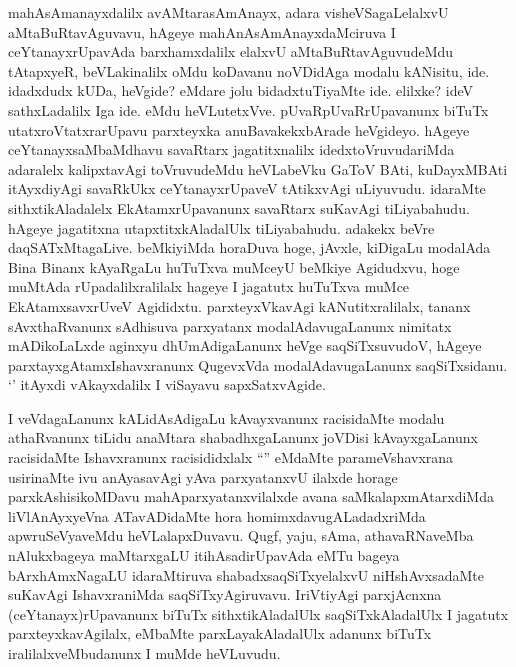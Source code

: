 \begin{artha}
mahAsAmanayxdalilx avAMtarasAmAnayx, adara visheVSagaLelalxvU
aMtaBuRtavAguvavu, hAgeye mahAnAsAmAnayxdaMciruva I ceYtanayxrUpavAda
barxhamxdalilx elalxvU aMtaBuRtavAguvudeMdu tAtapxyeR, beVLakinalilx
oMdu koDavanu noVDidAga modalu kANisitu, ide. idadxdudx kUDa, heVgide?
eMdare jolu bidadxtuTiyaMte ide. elilxke? ideV sathxLadalilx Iga
ide. eMdu heVLutetxVve. pUvaRpUvaRrUpavanunx biTuTx
utatxroVtatxrarUpavu parxteyxka anuBavakekxbArade heVgideyo. hAgeye
ceYtanayxsaMbaMdhavu savaRtarx jagatitxnalilx idedxtoVruvudariMda
adaralelx kalipxtavAgi toVruvudeMdu heVLabeVku GaToV BAti, kuDayxMBAti
itAyxdiyAgi savaRkUkx ceYtanayxrUpaveV tAtikxvAgi uLiyuvudu. idaraMte
sithxtikAladalelx EkAtamxrUpavanunx savaRtarx suKavAgi
tiLiyabahudu. hAgeye jagatitxna utapxtitxkAladalUlx
tiLiyabahudu. adakekx beVre daqSATxMtagaLive. beMkiyiMda horaDuva
hoge, jAvxle, kiDigaLu modalAda Bina Binanx kAyaRgaLu huTuTxva muMceyU
beMkiye Agidudxvu, hoge muMtAda rUpadalilxralilalx hageye I jagatutx
huTuTxva muMce EkAtamxsavxrUveV Agididxtu. parxteyxVkavAgi
kANutitxralilalx, tananx sAvxthaRvanunx sAdhisuva parxyatanx
modalAdavugaLanunx nimitatx mADikoLaLxde aginxyu dhUmAdigaLanunx heVge
saqSiTxsuvudoV, hAgeye parxtayxgAtamxIshavxranunx QugevxVda
modalAdavugaLanunx saqSiTxsidanu. `\stext' itAyxdi vAkayxdalilx I
viSayavu sapxSatxvAgide.
\end{artha}

\begin{center}


\end{center}

\begin{artha}
I veVdagaLanunx kALidAsAdigaLu kAvayxvanunx racisidaMte modalu
athaRvanunx tiLidu anaMtara shabadhxgaLanunx joVDisi kAvayxgaLanunx
racisidaMte Ishavxranunx racisididxlalx ``\stext'' eMdaMte
parameVshavxrana usirinaMte ivu anAyasavAgi yAva parxyatanxvU ilalxde
horage parxkAshisikoMDavu mahAparxyatanxvilalxde avana
saMkalapxmAtarxdiMda liVlAnAyxyeVna ATavADidaMte hora
homimxdavugALadadxriMda apwruSeVyaveMdu heVLalapxDuvavu. Qugf, yaju,
sAma, athavaRNaveMba nAlukxbageya maMtarxgaLU itihAsadirUpavAda eMTu
bageya bArxhAmxNagaLU idaraMtiruva shabadxsaqSiTxyelalxvU
niHshAvxsadaMte suKavAgi IshavxraniMda saqSiTxyAgiruvavu. IriVtiyAgi
parxjAcnxna (ceYtanayx)rUpavanunx biTuTx sithxtikAladalUlx
saqSiTxkAladalUlx I jagatutx parxteyxkavAgilalx, eMbaMte
parxLayakAladalUlx adanunx biTuTx iralilalxveMbudanunx I muMde
heVLuvudu. 
\end{artha}



